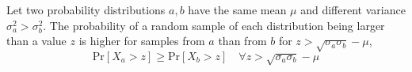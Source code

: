 %
\begin{lemma}
\label{lemma-same_mean_different_variance_bound} 
%
Let two probability distributions $a,b$ have the same mean $\mu$ and different variance $\sigma_a^2>\sigma_b^2$. 
%
The probability of a random sample of each distribution being larger than a value $z$ is higher for samples from $a$ than from $b$ for $z>\sqrt{\sigma_a \sigma_b} - \mu$,
%
\begin{equation}
    \text{Pr}\left[X_a>z\right]\geq \text{Pr}\left[X_b>z\right]\quad \forall z> \sqrt{\sigma_a \sigma_b} - \mu
\end{equation}
%
\end{lemma}
%